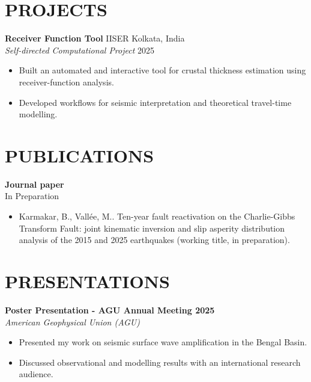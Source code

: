 \documentclass[a4paper,9pt]{extarticle}
\begin{document}
\section*{PROJECTS}
\noindent
\textbf{Receiver Function Tool} \hfill IISER Kolkata, India\\
\textit{Self-directed Computational Project}
   \hfill 2025

\begin{itemize}
     \item Built an automated and interactive tool for crustal thickness estimation using receiver-function analysis.
     \item Developed workflows for seismic interpretation and theoretical travel-time modelling.
\end{itemize}

\section*{PUBLICATIONS}
\noindent
\textbf{Journal paper}\\
\textup{In Preparation}
\begin{itemize}
    \item Karmakar, B., Vall\'ee, M.. Ten-year fault reactivation on the Charlie-Gibbs Transform Fault: joint kinematic inversion and slip asperity distribution analysis of the 2015 and 2025 earthquakes (working title, in preparation).
\end{itemize}

\section*{PRESENTATIONS}
\noindent
\textbf{Poster Presentation - AGU Annual Meeting 2025}\\
\textit{American Geophysical Union (AGU)}
\begin{itemize}
    \item Presented my work on seismic surface wave amplification in the Bengal Basin.
    \item Discussed observational and modelling results with an international research audience.
\end{itemize}
\end{document}

